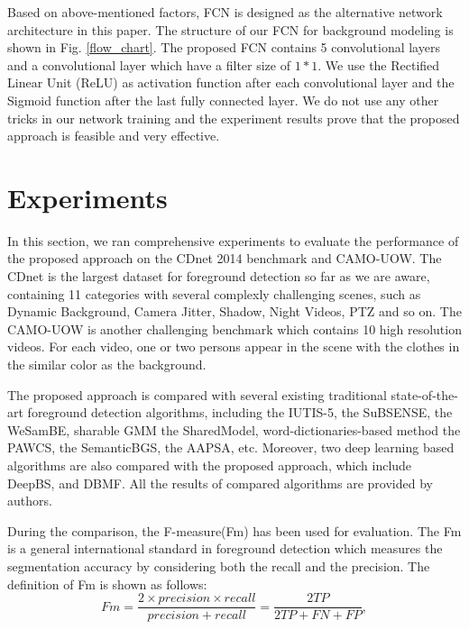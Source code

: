 \documentclass[journal]{IEEEtran}
\newcommand{\reffig}[1]{Fig. \ref{#1}}
\begin{document}
Based on above-mentioned factors, FCN is designed as the alternative network architecture in this paper. 
The structure of our FCN for background modeling is shown in \reffig{flow_chart}. 
The proposed FCN contains 5 convolutional layers and a convolutional layer which have a filter size of $1*1$. 
We use the Rectified Linear Unit (ReLU) as activation function after each convolutional layer and the Sigmoid function after the last fully connected layer. 
We do not use any other tricks in our network training and the experiment results prove that the proposed approach is feasible and very effective.


\section{Experiments}
\label{sec5}
In this section, we ran comprehensive experiments to evaluate the performance of the proposed approach on the CDnet 2014 benchmark\cite{CDN2014} and CAMO-UOW. 
The CDnet is the largest dataset for foreground detection so far as we are aware, containing 11 categories with several complexly challenging scenes, such as Dynamic Background, Camera Jitter, Shadow, Night Videos, PTZ and so on. 
The CAMO-UOW is another challenging benchmark which contains 10 high resolution videos. 
For each video, one or two persons appear in the scene with the clothes in the similar color as the background.

The proposed approach is compared with several existing traditional state-of-the-art foreground detection algorithms, including the IUTIS-5\cite{Bianco2017TEC}, the SuBSENSE\cite{St-Charles2015SuBSENSE}, the WeSamBE\cite{Jiang2017WeSamBE}, sharable GMM the SharedModel\cite{Chen2015SharedModel}, word-dictionaries-based method the PAWCS\cite{Charles2015PAWCS}, the SemanticBGS\cite{Braham2017Semantic}, the AAPSA\cite{RAMIREZALONSO2016990}, etc. 
Moreover, two deep learning based algorithms are also compared with the proposed approach, which include DeepBS\cite{Babaee2017deep}, and DBMF\cite{Yang2018DBMF}. 
All the results of compared algorithms are provided by authors.

During the comparison, the F-measure(Fm) has been used for evaluation. 
The Fm is a general international standard in foreground detection which measures the segmentation accuracy by considering both the recall and the precision. 
The definition of Fm is shown as follows:
\begin{equation}
Fm= \frac{2\times precision \times recall}{precision + recall} = \frac{2TP}{2TP+FN+FP},
\end{equation}
% 
% 
%
\end{document}
